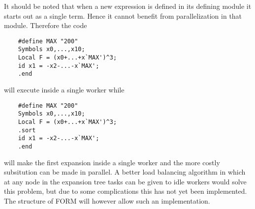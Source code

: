 It should be noted that when a new expression is defined in its defining 
module it starts out as a single term. Hence it cannot benefit from 
parallelization in that module. Therefore the code
\begin{verbatim}
    #define MAX "200"
    Symbols x0,...,x10;
    Local F = (x0+...+x`MAX')^3;
    id x1 = -x2-...-x`MAX';
    .end
\end{verbatim}
will execute inside a single worker while
\begin{verbatim}
    #define MAX "200"
    Symbols x0,...,x10;
    Local F = (x0+...+x`MAX')^3;
    .sort
    id x1 = -x2-...-x`MAX';
    .end
\end{verbatim}
will make the first expansion inside a single worker and the more costly 
subsitution can be made in parallel. A better load 
balancing algorithm in which at any node in the expansion tree tasks can be 
given to idle workers would solve this problem, but due to some 
complications this has not yet been implemented. The structure of FORM will 
however allow such an implementation.



